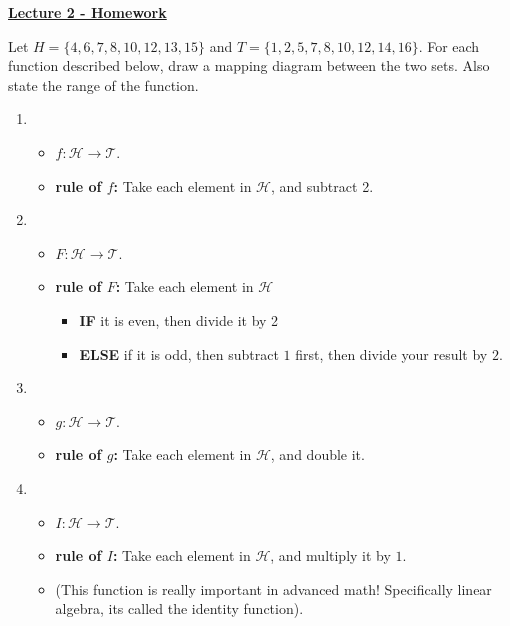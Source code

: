 \documentclass[12pt]{article} %
\begin{document}
\begin{center}
	\textbf{\underline{\Huge{Lecture 2 - Homework}}}
\end{center}
\begin{qstn}
  Let $H = \{4,6,7,8,10,12,13,15\}$ and $T = \{1,2,5,7,8,10,12,14,16\}$. For each function described below, draw a
  mapping diagram between the two sets. Also state the range of the function.

  \begin{enumerate}[label=(\alph*)]
    \item 
         \begin{itemize}
            \item $f \colon \mathcal{H} \to \mathcal{T}$.
            \item \textbf{rule of $f$:} Take each element in $\mathcal{H}$, and subtract 2.
        \end{itemize}

    \item 
       \begin{itemize}
            \item $F \colon \mathcal{H} \to \mathcal{T}$.
            \item \textbf{rule of $F$:} Take each element in $\mathcal{H}$
              \begin{itemize}
                \item \textbf{IF} it is even, then divide it by 2
                \item \textbf{ELSE} if it is odd, then subtract $1$ first, then divide your result by $2$.
              \end{itemize}
        \end{itemize}
    \item
      \begin{itemize}
            \item $g \colon \mathcal{H} \to \mathcal{T}$.
            \item \textbf{rule of $g$:} Take each element in $\mathcal{H}$, and double it.
      \end{itemize}

    \item
      \begin{itemize}
            \item $I \colon \mathcal{H} \to \mathcal{T}$.
            \item \textbf{rule of $I$:} Take each element in $\mathcal{H}$, and multiply it by $1$.
            \item (This function is really important in advanced math! Specifically linear algebra, its called the identity
              function).
      \end{itemize}

  \end{enumerate}
\end{qstn}
\end{document}
